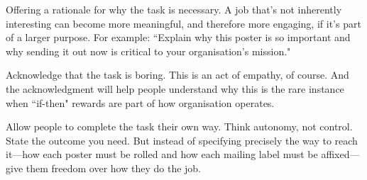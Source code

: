 \begin{compactitem}
\item Offering a rationale for why the task is necessary. A job that’s not inherently interesting can become more meaningful, and therefore more engaging, if it’s part of a larger purpose. For example: ``Explain why this poster is so important and why sending it out now is critical to your organisation’s mission."
\item Acknowledge that the task is boring. This is an act of empathy, of course. And the acknowledgment will help people understand why this is the rare instance when ``if-then" rewards are part of how organisation operates.
\item Allow people to complete the task their own way. Think autonomy, not control. State the outcome you need. But instead of specifying precisely the way to reach it—how each poster must be rolled and how each mailing label must be affixed—give them freedom over how they do the job.
\end{compactitem}

